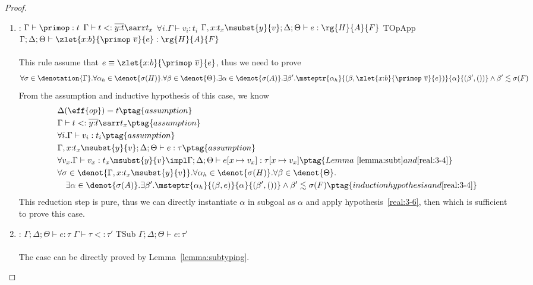 \begin{proof}
\begin{enumerate}[label=Case]
\item:
{\footnotesize
\mprooftr{58mm}
{
$\Gamma \vdash \primop : t$ \quad $\Gamma \vdash t <: \overline{y{:}t}\sarr t_x$
$\forall i. \Gamma \vdash v_i : t_i$ \quad
$\Gamma, x{:}t_x\msubst{y}{v};\Delta;\Theta \vdash e : \rg{H}{A}{F}$
}
{TOpApp}
{$\Gamma;\Delta;\Theta \vdash \zlet{x{:}b}{\primop\ \overline{v}}{e} : \rg{H}{A}{F}$}
\ \\ \ \\}
This rule assume that $e \equiv \zlet{x{:}b}{\primop\ \overline{v}}{e}$, thus we need to prove
{\footnotesize\begin{align*}
\forall \sigma \in
    \denotation{\Gamma}. \forall \alpha_h \in \denot{\sigma(H)}.\forall \beta \in \denot{\Theta}. \exists \alpha \in \denot{\sigma(A)}.\exists \beta'. \msteptr{\alpha_h}{(\beta, \zlet{x{:}b}{\primop\ \overline{v}}{e})}{\alpha}{(\beta', ())} \land \beta' \realz \sigma(F)
\end{align*}}\noindent
From the assumption and inductive hypothesis of this case, we know
{\footnotesize\begin{alignat}{2}
\setcounter{equation}{0}
&\Delta(\eff{op}) = t \ptag{assumption} \label{real:3-1} \\
&\Gamma \vdash t <: \overline{y{:}t}\sarr t_x \ptag{assumption} \label{real:3-2} \\
&\forall i. \Gamma \vdash v_i : t_i \ptag{assumption} \label{real:3-3} \\
&\Gamma, x{:}t_x\msubst{y}{v};\Delta;\Theta \vdash e : \tau \ptag{assumption} \label{real:3-4} \\
&\forall v_x. \Gamma \vdash v_x : t_x\msubst{y}{v} \impl \Gamma;\Delta;\Theta \vdash e[x\mapsto v_x] : \tau[x\mapsto v_x] \ptag{Lemma~\ref{lemma:subt} and \ref{real:3-4}} \label{real:3-5} \\
& \forall \sigma \in \denot{\Gamma,  x{:}t_x\msubst{y}{v}}.\forall \alpha_h \in \denot{\sigma(H)}. \forall \beta \in \denot{\Theta}.  \notag
\\&\quad \exists \alpha \in \denot{\sigma(A)}. \exists \beta'. \msteptr{\alpha_h}{(\beta, e)}{\alpha}{(\beta', ())} \land \beta' \realz \sigma(F)
\ptag{induction hypothesis and \ref{real:3-4}} \label{real:3-6}
\end{alignat}}\noindent
This reduction step is pure, thus we can directly instantiate $\alpha$ in subgoal as $\alpha$ and apply hypothesis~\ref{real:3-6}, then which is sufficient to prove this case.

\item:
{\footnotesize
\mprooftr{38mm}
{$\Gamma;\Delta;\Theta \vdash e : \tau$ \quad
$\Gamma \vdash \tau <: \tau'$}
{TSub}
{$\Gamma;\Delta;\Theta \vdash e : \tau'$}
\ \\ \ \\}
The case can be directly proved by Lemma~\ref{lemma:subtyping}.

\end{enumerate}
\end{proof}

